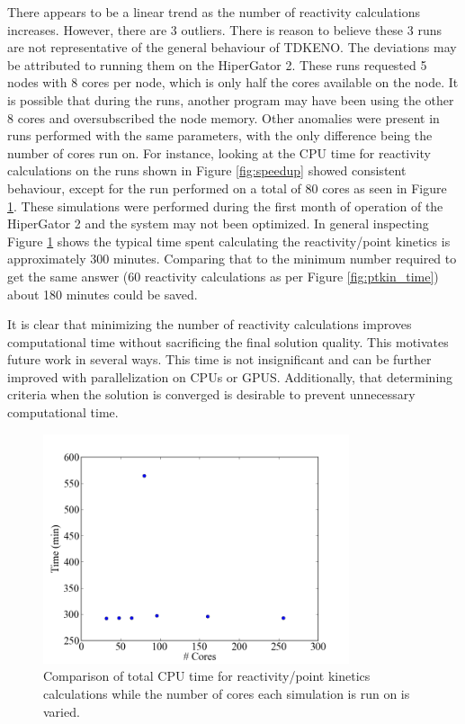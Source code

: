 \documentclass{anstrans}
\begin{document}
There appears to be a linear trend as the number of reactivity calculations increases.  However, there are 3 outliers.  There is reason to believe these 3 runs are not representative of the general behaviour of TDKENO. The deviations may be attributed to running them on the HiperGator 2. These runs requested 5 nodes with 8 cores per node, which is only half the cores available on the node.  It is possible that during the runs, another program may have been using the other 8 cores and oversubscribed the node memory.  Other anomalies were present in runs performed with the same parameters, with the only difference being the number of cores run on.  For instance, looking at the CPU time for reactivity calculations on the runs shown in Figure \ref{fig:speedup} showed consistent behaviour, except for the run performed on a total of 80 cores as seen in Figure \ref{fig:ptkin_same_time}. These simulations were performed during the first month of operation of the HiperGator 2 and the system may not been optimized.  In general inspecting Figure \ref{fig:ptkin_same_time} shows the typical time spent calculating the reactivity/point kinetics is approximately 300 minutes.  Comparing that to the minimum number required to get the same answer (60 reactivity calculations as per Figure \ref{fig:ptkin_time}) about 180 minutes could be saved.  

It is clear that minimizing the number of reactivity calculations improves computational time without sacrificing the final solution quality.  This motivates future work in several ways.  This time is not insignificant and can be further improved with parallelization on CPUs or GPUS.  Additionally, that determining criteria when the solution is converged is desirable to prevent unnecessary computational time.   

\begin{figure}[h]
    \centering
    \includegraphics[width=9cm]{figures/comp_time_same-ptkin.png}
    \caption{Comparison of total CPU time for reactivity/point kinetics calculations while the number of cores each simulation is run on is varied.}
    \label{fig:ptkin_same_time}
\end{figure}
\end{document}
